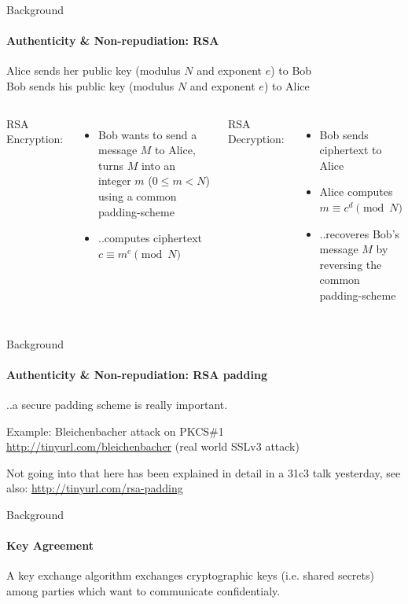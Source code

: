 \documentclass[hyperref={draft}]{beamer}
\begin{document}
\begin{frame}{Background}
  \framesubtitle{Authenticity \& Non-repudiation: RSA}
  Alice sends her public key (modulus $N$ and exponent $e$) to Bob\\
  Bob sends his public key (modulus $N$ and exponent $e$) to Alice
  \vspace{10px}
  \begin{columns}[T]
    RSA Encryption:
    \begin{itemize}
      \item Bob wants to send a message $M$ to Alice, turns $M$ into an integer $m$ ($0 \leq m < N$) using a common padding-scheme
      \item ..computes ciphertext\\ $c \equiv m^e \pmod N$
    \end{itemize}
    RSA Decryption:
    \begin{itemize}
      \item Bob sends ciphertext to Alice
      \item Alice computes\\$m \equiv c^d \pmod N$
      \item ..recoveres Bob's message $M$ by reversing the common padding-scheme
    \end{itemize}
  \end{columns}
\end{frame}

\begin{frame}{Background}
  \framesubtitle{Authenticity \& Non-repudiation: RSA padding}
  ..a secure padding scheme is really important.

  \vspace{20px}
 
  Example: Bleichenbacher attack on PKCS\#1\\
  \url{http://tinyurl.com/bleichenbacher} (real world SSLv3 attack)
  
  \vspace{20px}

  Not going into that here has been explained in detail in a 31c3 talk yesterday, see also: \url{http://tinyurl.com/rsa-padding}
\end{frame}

\begin{frame}{Background}
  \framesubtitle{Key Agreement}
  A key exchange algorithm exchanges cryptographic keys (i.e. shared secrets) among parties which want to communicate confidentialy.
\end{frame}
\end{document}
